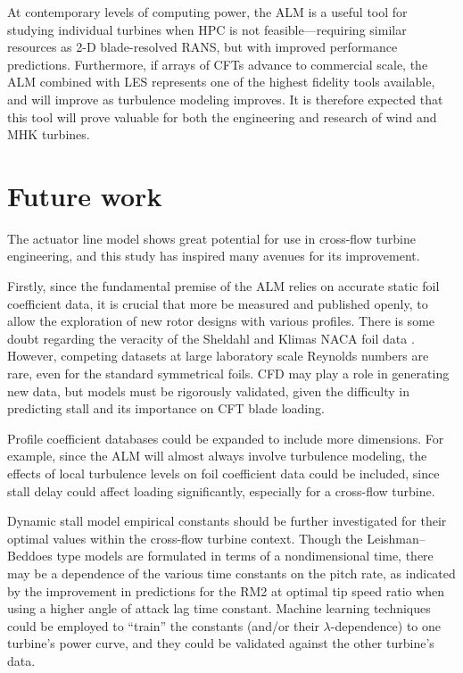 At contemporary levels of computing power, the ALM is a useful tool for studying
individual turbines when HPC is not feasible---requiring similar resources as
2-D blade-resolved RANS, but with improved performance predictions. Furthermore,
if arrays of CFTs advance to commercial scale, the ALM combined with LES
represents one of the highest fidelity tools available, and will improve as
turbulence modeling improves. It is therefore expected that this tool will prove
valuable for both the engineering and research of wind and MHK turbines.


\section{Future work}

The actuator line model shows great potential for use in cross-flow turbine
engineering, and this study has inspired many avenues for its improvement.

Firstly, since the fundamental premise of the ALM relies on accurate static foil
coefficient data, it is crucial that more be measured and published openly, to
allow the exploration of new rotor designs with various profiles. There is some
doubt regarding the veracity of the Sheldahl and Klimas NACA foil data
\cite{Bedon2014}. However, competing datasets at large laboratory scale Reynolds
numbers are rare, even for the standard symmetrical foils. CFD may play a role
in generating new data, but models must be rigorously validated, given the
difficulty in predicting stall and its importance on CFT blade loading.

Profile coefficient databases could be expanded to include more dimensions. For
example, since the ALM will almost always involve turbulence modeling, the
effects of local turbulence levels on foil coefficient data could be included,
since stall delay could affect loading significantly, especially for a
cross-flow turbine.

Dynamic stall model empirical constants should be further investigated for their
optimal values within the cross-flow turbine context. Though the
Leishman--Beddoes type models are formulated in terms of a nondimensional time,
there may be a dependence of the various time constants on the pitch rate, as
indicated by the improvement in predictions for the RM2 at optimal tip speed
ratio when using a higher angle of attack lag time constant. Machine learning
techniques could be employed to ``train'' the constants (and/or their
$\lambda$-dependence) to one turbine's power curve, and they could be validated
against the other turbine's data.

